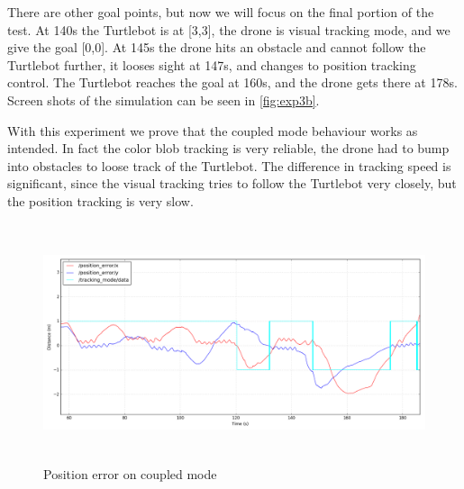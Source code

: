 \documentclass[11pt,a4paper]{article}
\begin{document}
There are other goal points, but now we will focus on the final portion of the test. At 140s the Turtlebot is at [3,3], the drone is visual tracking mode, and we give the goal [0,0]. At 145s the drone hits an obstacle and cannot follow the Turtlebot further, it looses sight at 147s, and changes to position tracking control. The Turtlebot reaches the goal at 160s, and the drone gets there at 178s. Screen shots of the simulation can be seen in \ref{fig:exp3b}.

With this experiment we prove that the coupled mode behaviour works as intended. In fact the color blob tracking is very reliable, the drone had to bump into obstacles to loose track of the Turtlebot. 
The difference in tracking speed is significant, since the visual tracking tries to follow the Turtlebot very closely, but the position tracking is very slow. 

\begin{figure}[ht]	
\centering
\includegraphics[height=7cm]{error1video.png}
\caption{Position error on coupled mode}
\label{fig:exp3}
\end{figure}
\end{document}
